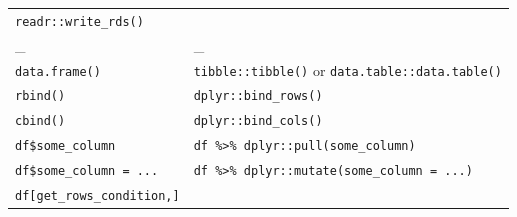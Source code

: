 \documentclass[]{book}
\begin{document}
\begin{longtable}[]{@{}ll@{}}
\begin{minipage}[t]{0.05\columnwidth}
\texttt{readr::write\_rds()}\strut
\end{minipage}\tabularnewline
\begin{minipage}[t]{0.05\columnwidth}\raggedright\strut
\_\strut
\end{minipage} & \begin{minipage}[t]{0.05\columnwidth}\raggedright\strut
\_\strut
\end{minipage}\tabularnewline
\begin{minipage}[t]{0.05\columnwidth}\raggedright\strut
\texttt{data.frame()}\strut
\end{minipage} & \begin{minipage}[t]{0.05\columnwidth}\raggedright\strut
\texttt{tibble::tibble()} or \texttt{data.table::data.table()}\strut
\end{minipage}\tabularnewline
\begin{minipage}[t]{0.05\columnwidth}\raggedright\strut
\texttt{rbind()}\strut
\end{minipage} & \begin{minipage}[t]{0.05\columnwidth}\raggedright\strut
\texttt{dplyr::bind\_rows()}\strut
\end{minipage}\tabularnewline
\begin{minipage}[t]{0.05\columnwidth}\raggedright\strut
\texttt{cbind()}\strut
\end{minipage} & \begin{minipage}[t]{0.05\columnwidth}\raggedright\strut
\texttt{dplyr::bind\_cols()}\strut
\end{minipage}\tabularnewline
\begin{minipage}[t]{0.05\columnwidth}\raggedright\strut
\texttt{df\$some\_column}\strut
\end{minipage} & \begin{minipage}[t]{0.05\columnwidth}\raggedright\strut
\texttt{df\ \%\textgreater{}\%\ dplyr::pull(some\_column)}\strut
\end{minipage}\tabularnewline
\begin{minipage}[t]{0.05\columnwidth}\raggedright\strut
\texttt{df\$some\_column\ =\ ...}\strut
\end{minipage} & \begin{minipage}[t]{0.05\columnwidth}\raggedright\strut
\texttt{df\ \%\textgreater{}\%\ dplyr::mutate(some\_column\ =\ ...)}\strut
\end{minipage}\tabularnewline
\begin{minipage}[t]{0.05\columnwidth}\raggedright\strut
\texttt{df{[}get\_rows\_condition,{]}}\strut

\end{minipage}
\end{longtable}
\end{document}
